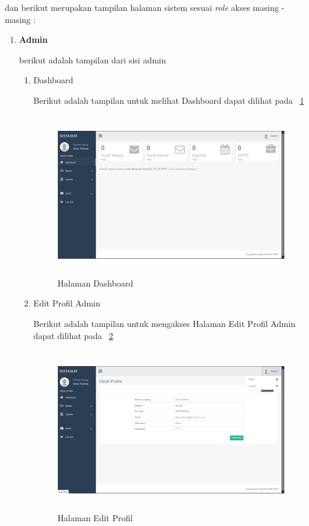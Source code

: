 dan berikut merupakan tampilan halaman sistem sesuai \textit{role} akses masing - masing :

\begin{enumerate}
	\item \textbf{Admin}
	
	berikut adalah tampilan dari sisi admin
	
	\begin{enumerate}
		\item Dashboard
		
		Berikut adalah tampilan untuk melihat Dashboard dapat dilihat pada \pic~\ref{HalamanDashboard}
		
		\begin{figure}
			\centering
			\includegraphics [height= 7cm, width=11cm]{konten/gambar/UISistemSurat/Admin/0.1.Dashboard.png}
			\caption{Halaman Dashboard}
			\label{HalamanDashboard}
		\end{figure}
		
		\item Edit Profil Admin
		
		Berikut adalah tampilan untuk mengakses Halaman Edit Profil Admin dapat dilihat pada \pic~\ref{HalamanEditProfilAdmin}
		
		\begin{figure}
			\centering
			\includegraphics [height= 7cm, width=11cm]{konten/gambar/UISistemSurat/Admin/1.1.DetailProfile.png}
			\caption{Halaman Edit Profil}
			\label{HalamanEditProfilAdmin}
		\end{figure}
		

\end{enumerate}
\end{enumerate}
